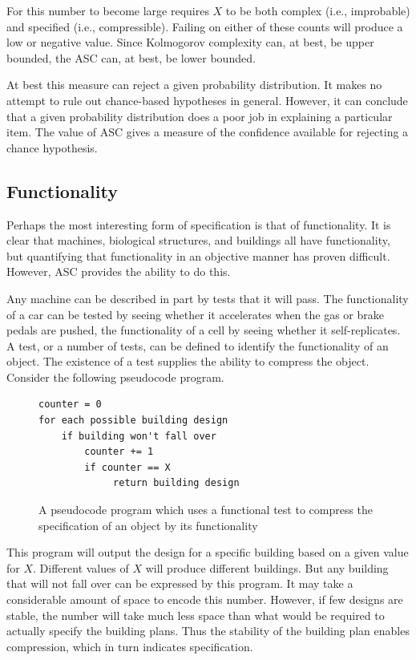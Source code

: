 For this number to become large requires $X$ to be both complex (i.e., improbable) and specified (i.e., compressible).
Failing on either of these counts will produce a low or negative value.
Since Kolmogorov complexity can, at best, be upper bounded, the ASC can, at best, be lower bounded.

At best this measure can reject a given probability distribution.
It makes no attempt to rule out chance-based hypotheses in general.
However, it can conclude that a given probability distribution does a poor job in explaining a particular item.
The value of ASC gives a measure of the confidence available for rejecting a chance hypothesis.

\subsection{Functionality}

Perhaps the most interesting form of specification is that of functionality.
It is clear that machines, biological structures, and buildings all have functionality,
but quantifying that functionality in an objective manner has proven difficult.
However, ASC provides the ability to do this.

Any machine can be described in part by tests that it will pass.
The functionality of a car can be tested by seeing whether it accelerates when the gas or brake pedals are pushed,
the functionality of a cell by seeing whether it self-replicates.
A test, or a number of tests, can be defined to identify the functionality of an object. 
The existence of a test supplies the ability to compress the object.
Consider the following pseudocode program.

\begin{figure}[H]
\begin{mdframed}
\begin{verbatim}
counter = 0
for each possible building design
    if building won't fall over
        counter += 1
        if counter == X
             return building design
\end{verbatim} 
\end{mdframed}
\caption{A pseudocode program which uses a functional test to compress the specification of an object by its functionality}
\end{figure}
This program will output the design for a specific building based on a given value for $X$.
Different values of $X$ will produce different buildings.
But any building that will not fall over can be expressed by this program.
It may take a considerable amount of space to encode this number.
However, if few designs are stable, the number will take much less space than what would be required to actually specify the building plans.
Thus the stability of the building plan enables compression, which in turn indicates specification.


